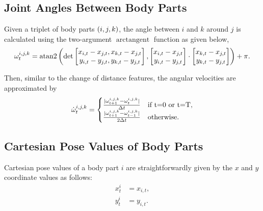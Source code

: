 \begin{figure}[ht!]
\begin{subfigure}[ht!]{0.333\linewidth}
		\caption{}
	\end{subfigure}%
	\caption{}
\end{figure}

\subsection{Joint Angles Between Body Parts}
Given a triplet of body parts $\left(i,j,k\right)$, the angle between $i$ and $k$ around $j$ is calculated using the two-argument $\operatorname{arctangent}$ function as given below,
\begin{equation}
	\omega^{i,j,k}_t = \mathop{\rm{atan2}} \left(\det \begin{bmatrix} x_{i,t} - x_{j,t}, x_{k,t} - x_{j,t} \\ y_{i,t} - y_{j,t}, y_{k,t} - y_{j,t} \end{bmatrix}, \begin{bmatrix} x_{i,t} - x_{j,t} \\ y_{i,t} - y_{j,t} \end{bmatrix} \cdot \begin{bmatrix} x_{k,t} - x_{j,t}  \\ y_{k,t} - y_{j,t} \end{bmatrix}\right) + \pi.
\end{equation}

Then, similar to the change of distance features, the angular velocities are approximated by
\begin{equation}
	\dot{\omega}^{i,j,k}_t = \begin{cases} \frac{\abs*{\omega^{i,j,k}_{t+1} - \omega^{i,j,k}_{t}}}{\Delta t} & \textnormal{if } $t=0$ \textnormal{ or } $t=T$, \\ \frac{\abs*{\omega^{i,j,k}_{t+1} - \omega^{i,j,k}_{t-1}}}{2\Delta t} & \textnormal{otherwise}. \end{cases}
\end{equation}

\subsection{Cartesian Pose Values of Body Parts}
Cartesian pose values of a body part $i$ are straightforwardly given by the $x$ and $y$ coordinate values as follows:
\begin{equation}
	\begin{aligned}
		x^{i}_t & = x_{i,t}, \\
		y^{i}_t & = y_{i,t}.
	\end{aligned}
\end{equation}

